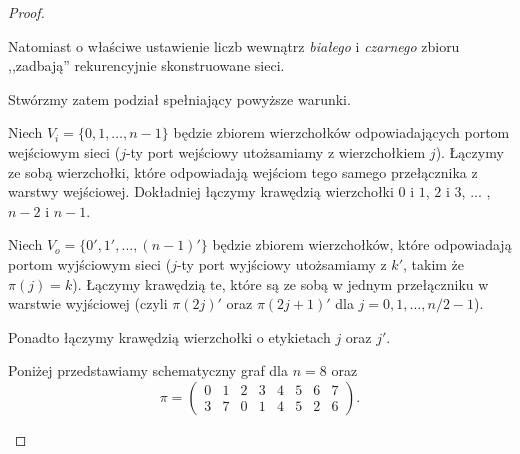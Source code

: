 \documentclass[a4paper]{article}
\theoremstyle{definition}
\begin{document}
\begin{proof}
\begin{enumerate}
        Natomiast o właściwe ustawienie liczb wewnątrz \emph{białego} i \emph{czarnego} zbioru ,,zadbają'' rekurencyjnie skonstruowane sieci.

        \vspace{.1em}

        Stwórzmy zatem podział spełniający powyższe warunki. 

        \vspace{.1em}
        
        Niech \(V_i = \{ 0, 1, \ldots, n-1 \}\) będzie zbiorem wierzchołków odpowiadających portom wejściowym sieci (\(j\)-ty port wejściowy  utożsamiamy z wierzchołkiem \(j\)). Łączymy ze sobą wierzchołki, które odpowiadają wejściom tego samego przełącznika z warstwy wejściowej. Dokładniej łączymy krawędzią  wierzchołki $0$ i $1$, $2$ i $3$, ... , $n-2$ i $n-1$. 

        \vspace{.1em}
        Niech $V_o = \{0', 1', \ldots, (n-1)'\}$ będzie zbiorem wierzchołków, które odpowiadają portom wyjściowym sieci (\(j\)-ty port wyjściowy utożsamiamy z \(k'\), takim że \(\pi(j) = k\)). Łączymy krawędzią te, które są ze sobą w jednym przełączniku w warstwie wyjściowej (czyli \(\pi(2j)'\) oraz \(\pi(2j+1)'\) dla \(j = 0, 1, \ldots, n/2 - 1\)). 

        
        Ponadto łączymy krawędzią wierzchołki o etykietach $j$ oraz $j'$.

        Poniżej przedstawiamy schematyczny graf dla \(n = 8\) oraz 
        \[
            \pi = \begin{pmatrix}
                0 & 1 & 2 & 3 & 4 & 5 & 6 & 7 \\
                3 & 7 & 0 & 1 & 4 & 5 & 2 & 6
              \end{pmatrix}.
        \]


\end{enumerate}
\end{proof}
\end{document}
